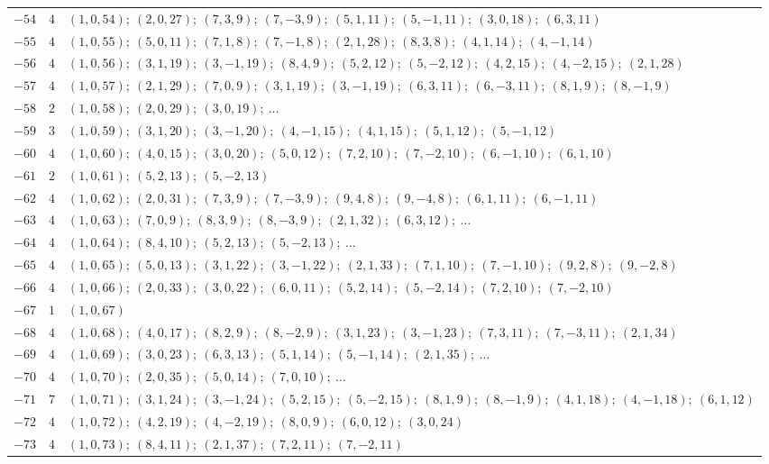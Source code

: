 \documentclass[11pt,a4paper]{article}
\theoremstyle{plain}
\begin{document}
\begin{longtable}{r|c|p{}}
$-54$ & $4$ & $(1,0,54);\ (2,0,27);\ (7,3,9);\ (7,-3,9);\ (5,1,11);\ (5,-1,11);\ (3,0,18);\ (6,3,11)$ \\
$-55$ & $4$ & $(1,0,55);\ (5,0,11);\ (7,1,8);\ (7,-1,8);\ (2,1,28);\ (8,3,8);\ (4,1,14);\ (4,-1,14)$ \\
$-56$ & $4$ & $(1,0,56);\ (3,1,19);\ (3,-1,19);\ (8,4,9);\ (5,2,12);\ (5,-2,12);\ (4,2,15);\ (4,-2,15);\ (2,1,28)$ \\
$-57$ & $4$ & $(1,0,57);\ (2,1,29);\ (7,0,9);\ (3,1,19);\ (3,-1,19);\ (6,3,11);\ (6,-3,11);\ (8,1,9);\ (8,-1,9)$ \\
$-58$ & $2$ & $(1,0,58);\ (2,0,29);\ (3,0,19);\ \ldots$ \\
$-59$ & $3$ & $(1,0,59);\ (3,1,20);\ (3,-1,20);\ (4,-1,15);\ (4,1,15);\ (5,1,12);\ (5,-1,12)$ \\
$-60$ & $4$ & $(1,0,60);\ (4,0,15);\ (3,0,20);\ (5,0,12);\ (7,2,10);\ (7,-2,10);\ (6,-1,10);\ (6,1,10)$ \\
$-61$ & $2$ & $(1,0,61);\ (5,2,13);\ (5,-2,13)$ \\
$-62$ & $4$ & $(1,0,62);\ (2,0,31);\ (7,3,9);\ (7,-3,9);\ (9,4,8);\ (9,-4,8);\ (6,1,11);\ (6,-1,11)$ \\
$-63$ & $4$ & $(1,0,63);\ (7,0,9);\ (8,3,9);\ (8,-3,9);\ (2,1,32);\ (6,3,12);\ \ldots$ \\
$-64$ & $4$ & $(1,0,64);\ (8,4,10);\ (5,2,13);\ (5,-2,13);\ \ldots$ \\
$-65$ & $4$ & $(1,0,65);\ (5,0,13);\ (3,1,22);\ (3,-1,22);\ (2,1,33);\ (7,1,10);\ (7,-1,10);\ (9,2,8);\ (9,-2,8)$ \\
$-66$ & $4$ & $(1,0,66);\ (2,0,33);\ (3,0,22);\ (6,0,11);\ (5,2,14);\ (5,-2,14);\ (7,2,10);\ (7,-2,10)$ \\
$-67$ & $1$ & $(1,0,67)$ \\
$-68$ & $4$ & $(1,0,68);\ (4,0,17);\ (8,2,9);\ (8,-2,9);\ (3,1,23);\ (3,-1,23);\ (7,3,11);\ (7,-3,11);\ (2,1,34)$ \\
$-69$ & $4$ & $(1,0,69);\ (3,0,23);\ (6,3,13);\ (5,1,14);\ (5,-1,14);\ (2,1,35);\ \ldots$ \\
$-70$ & $4$ & $(1,0,70);\ (2,0,35);\ (5,0,14);\ (7,0,10);\ \ldots$ \\
$-71$ & $7$ & $(1,0,71);\ (3,1,24);\ (3,-1,24);\ (5,2,15);\ (5,-2,15);\ (8,1,9);\ (8,-1,9);\ (4,1,18);\ (4,-1,18);\ (6,1,12)$ \\
$-72$ & $4$ & $(1,0,72);\ (4,2,19);\ (4,-2,19);\ (8,0,9);\ (6,0,12);\ (3,0,24)$ \\
$-73$ & $4$ & $(1,0,73);\ (8,4,11);\ (2,1,37);\ (7,2,11);\ (7,-2,11)$ \\

\end{longtable}
\end{document}
